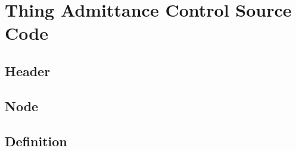 \chapter{Thing Admittance Control Source Code}\label{sec:code}


\section{Header}

\section{Node}

\section{Definition}
